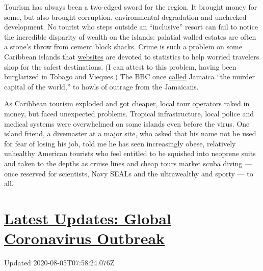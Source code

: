 Tourism has always been a two-edged sword for the region. It brought
money for some, but also brought corruption, environmental degradation
and unchecked development. No tourist who steps outside an ``inclusive''
resort can fail to notice the incredible disparity of wealth on the
islands: palatial walled estates are often a stone's throw from cement
block shacks. Crime is such a problem on some Caribbean islands that
\href{https://www.tripsavvy.com/safest-and-most-dangerous-caribbean-islands-4157732}{websites}
are devoted to statistics to help worried travelers shop for the safest
destinations. (I can attest to this problem, having been burglarized in
Tobago and Vieques.) The BBC once
\href{http://www.bbc.co.uk/caribbean/news/story/2006/01/060103_murderlist.shtml}{called}
Jamaica ``the murder capital of the world,'' to howls of outrage from
the Jamaicans.

As Caribbean tourism exploded and got cheaper, local tour operators
raked in money, but faced unexpected problems. Tropical infrastructure,
local police and medical systems were overwhelmed on some islands even
before the virus. One island friend, a divemaster at a major site, who
asked that his name not be used for fear of losing his job, told me he
has seen increasingly obese, relatively unhealthy American tourists who
feel entitled to be squished into neoprene suits and taken to the depths
as cruise lines and cheap tours market scuba diving --- once reserved
for scientists, Navy SEALs and the ultrawealthy and sporty --- to all.

\hypertarget{latest-updates-global-coronavirus-outbreak}{%
\section{\texorpdfstring{\href{https://www.nytimes3xbfgragh.onion/2020/08/04/world/coronavirus-cases.html?action=click\&pgtype=Article\&state=default\&region=MAIN_CONTENT_1\&context=storylines_live_updates}{Latest
Updates: Global Coronavirus
Outbreak}}{Latest Updates: Global Coronavirus Outbreak}}\label{latest-updates-global-coronavirus-outbreak}}

Updated 2020-08-05T07:58:24.076Z

